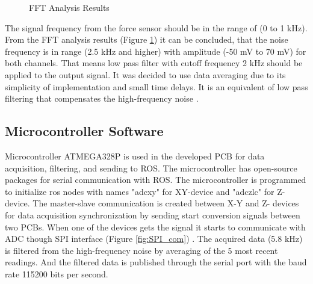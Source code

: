 \begin{figure}[h]%
\centering
{}%
\qquad
{}%
\caption{FFT Analysis Results}
\label{fig:FFT_res}
\end{figure}
	
	The signal frequency from the force sensor should be in the range of (0 to 1 kHz). From the FFT analysis results (Figure \ref{fig:FFT_res}) it can be concluded, that the noise frequency is in range (2.5 kHz and higher) with amplitude (-50 mV to 70 mV) for both channels. That means low pass filter with cutoff frequency 2 kHz should be applied to the output signal. It was decided to use data averaging due to its simplicity of implementation and small time delays. It is an equivalent of low pass filtering that compensates the high-frequency noise \cite{filtering_mov_ave}.

	\subsection{Microcontroller Software}
	\label{sec:MicrSoft}
	Microcontroller ATMEGA328P is used in the developed PCB for data acquisition, filtering, and sending to ROS. The microcontroller has open-source packages for serial communication with ROS. The microcontroller is programmed to initialize ros nodes with names "adc\textunderscore xy" for XY-device and "adc\textunderscore zlc" for Z-device. The master-slave communication is created between X-Y and Z- devices for data acquisition synchronization by sending start conversion signals between two PCBs. When one of the devices gets the signal it starts to communicate with ADC though SPI interface (Figure \ref{fig:SPI_com}) \cite{introduction_SPI}. The acquired data (5.8 kHz) is filtered from the high-frequency noise by averaging of the 5 most recent readings. And the filtered data is published through the serial port with the baud rate 115200 bits per second. 
	
